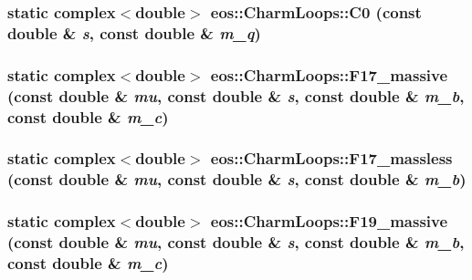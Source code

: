 \label{structeos_1_1CharmLoops_a41ed4114fe8c4a25702232a9421b8e05}
\hypertarget{structeos_1_1CharmLoops_a0d4ed4a2d4d8e9c3c353bf1922e78c77}{
\subsubsection[{C0}]{\setlength{\rightskip}{0pt plus 5cm}static complex$<$double$>$ eos::CharmLoops::C0 (const double \& {\em s}, \/  const double \& {\em m\_\-q})}}
\label{structeos_1_1CharmLoops_a0d4ed4a2d4d8e9c3c353bf1922e78c77}
\hypertarget{structeos_1_1CharmLoops_ab9c16844121670118512a2d47f74284e}{
\subsubsection[{F17\_\-massive}]{\setlength{\rightskip}{0pt plus 5cm}static complex$<$double$>$ eos::CharmLoops::F17\_\-massive (const double \& {\em mu}, \/  const double \& {\em s}, \/  const double \& {\em m\_\-b}, \/  const double \& {\em m\_\-c})}}
\label{structeos_1_1CharmLoops_ab9c16844121670118512a2d47f74284e}
\hypertarget{structeos_1_1CharmLoops_a0e49ca63c218a3bc80575df602508454}{
\subsubsection[{F17\_\-massless}]{\setlength{\rightskip}{0pt plus 5cm}static complex$<$double$>$ eos::CharmLoops::F17\_\-massless (const double \& {\em mu}, \/  const double \& {\em s}, \/  const double \& {\em m\_\-b})}}
\label{structeos_1_1CharmLoops_a0e49ca63c218a3bc80575df602508454}
\hypertarget{structeos_1_1CharmLoops_a4ed440c1f33914e6c2e5b825b24e384e}{
\subsubsection[{F19\_\-massive}]{\setlength{\rightskip}{0pt plus 5cm}static complex$<$double$>$ eos::CharmLoops::F19\_\-massive (const double \& {\em mu}, \/  const double \& {\em s}, \/  const double \& {\em m\_\-b}, \/  const double \& {\em m\_\-c})}}

